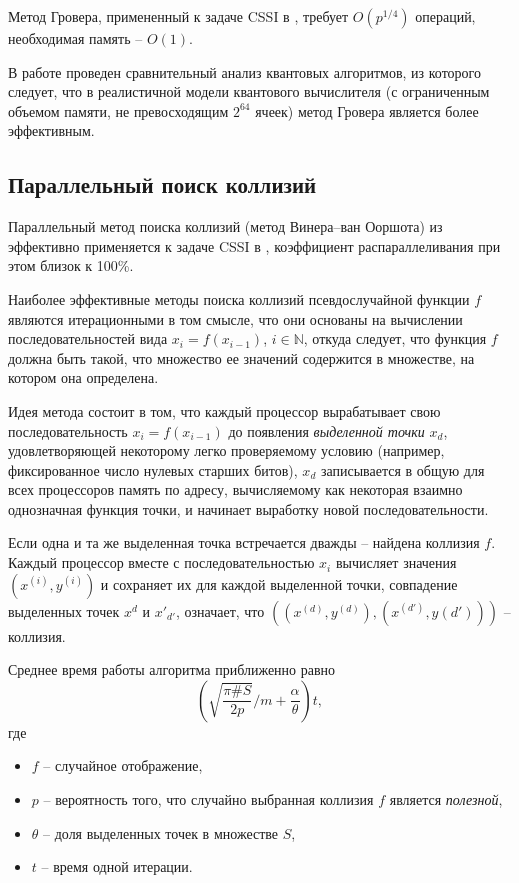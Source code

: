 \documentclass[a4paper,12pt]{article}
\newcommand{\NN}{\mathbb{N}}
\theoremstyle{definition}
\begin{document}
Метод Гровера, примененный к задаче CSSI в \cite{FFF}, требует $O(p^{1/4})$ операций,  необходимая память -- $O(1)$.

В работе \cite{FFF} проведен сравнительный анализ квантовых  алгоритмов, из которого следует, что в реалистичной модели квантового вычислителя (с ограниченным объемом памяти, не превосходящим
$2^{64}$ ячеек) метод Гровера является более эффективным.

 \subsection*{Параллельный поиск коллизий}
 
Параллельный метод поиска коллизий (метод Винера--ван Ооршота)  из \cite{vOW} эффективно применяется к задаче CSSI в \cite{Adj,Costello}, коэффициент
распараллеливания при этом близок к 100\%.

Наиболее эффективные методы поиска коллизий псевдослучайной функции $f$ являются итерационными в том смысле, что они основаны на вычислении 
последовательностей вида $x_i = f(x_{i-1})$, $i \in \NN$, откуда следует, что функция $f$ должна быть такой, что множество ее значений содержится в множестве, 
на котором она определена.
 
Идея метода состоит в том, что
каждый процессор вырабатывает свою последовательность $x_i=f(x_{i-1})$ до появления \emph{выделенной точки} $x_d$, удовлетворяющей некоторому легко проверяемому условию (например, фиксированное число нулевых старших битов), $x_d$ записывается в общую для всех процессоров память по адресу, вычисляемому как некоторая взаимно однозначная функция точки, и начинает выработку новой последовательности.


Если одна и та же выделенная точка встречается дважды -- найдена коллизия $f$. Каждый процессор вместе с последовательностью $x_i$ вычисляет значения $(x^{(i)},y^{(i)})$ и сохраняет их для каждой выделенной точки, совпадение выделенных точек $x^d$ и $x'_{d'}$, означает, что $((x^{(d)}, y^{(d)}), (x^{(d')}, y{(d')}))$ -- коллизия.

Среднее время работы алгоритма приближенно равно
$$
\left(\sqrt{\frac{\pi\#S}{2p}}/m+\frac{\alpha}{\theta}\right)t,
$$
где
\begin{itemize}
\item $f$ -- случайное отображение,
\item $p$ -- вероятность того, что случайно выбранная коллизия $f$ является \emph{полезной},
\item $\theta$ -- доля выделенных точек в множестве $S$,
\item $t$ -- время одной итерации.
\end{itemize}
\end{document}
